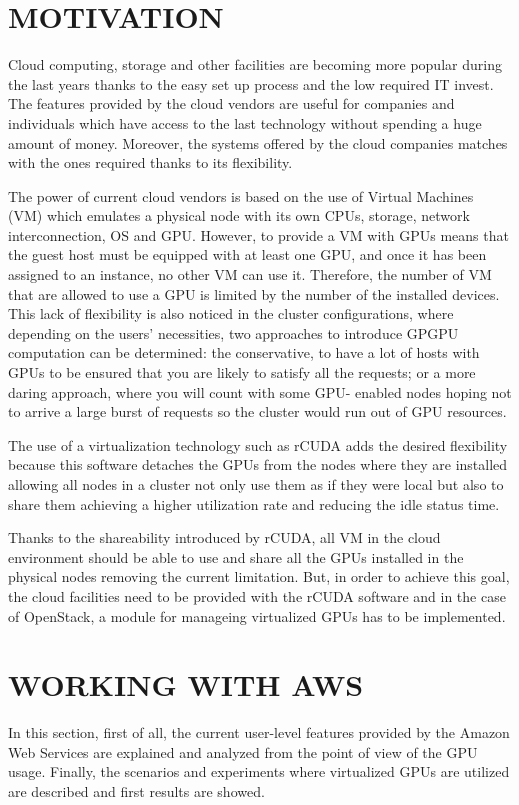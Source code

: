 \documentclass[a4paper,twoside]{article}
\begin{document}
\section{\uppercase{Motivation}}
\label{sec:motivation}

Cloud computing, storage and other facilities are becoming 
more popular during the last years thanks to the easy set up 
process and the low required IT invest. The features provided 
by the cloud vendors are useful for companies and individuals 
which have access to the last technology without spending a 
huge amount of money. Moreover, the systems offered by the cloud 
companies matches with the ones required thanks to its flexibility.

The power of current cloud vendors is based on the use 
of Virtual Machines (VM) which  
emulates a physical node with its own 
CPUs, storage, network interconnection, OS and GPU. 
However, to provide a VM with GPUs means
that the guest host must be equipped with at least one GPU, and
once it has been assigned to an instance, no other VM can use
it. Therefore, the number of VM that are allowed to use a GPU is 
limited by the number of the installed devices. This lack of 
flexibility is also noticed in the cluster configurations, where 
depending on the users’ necessities, 
two approaches to introduce GPGPU computation can be determined:
the conservative, to have a lot of hosts with GPUs to be
ensured that you are likely to satisfy all the requests; or a
more daring approach, where you will count with some GPU-
enabled nodes hoping not to arrive a large burst of requests
so the cluster would run out of GPU resources.

The use of a virtualization technology such as {rCUDA} adds 
the desired flexibility because this software detaches the GPUs 
from the nodes where they are installed allowing all nodes in a cluster
not only use them as if they were local but also to share them 
achieving a higher utilization rate and reducing the idle status time.

Thanks to the shareability introduced by {rCUDA}, all VM in the cloud 
environment should be able to use and share all the GPUs installed in 
the physical nodes removing the current limitation. But, in order to achieve this goal, 
the cloud facilities need to be provided with the {rCUDA} software and 
in the case of OpenStack, a module for manageing virtualized GPUs 
 has to be implemented.  



\section{\uppercase{Working with AWS}}
\label{sec:aws}
In this section, first of all, the current user-level features 
provided by the Amazon Web Services are explained and analyzed 
from the point of view of the GPU usage. 
Finally, the scenarios and experiments where virtualized GPUs are utilized are 
described and first results are showed.
\end{document}
